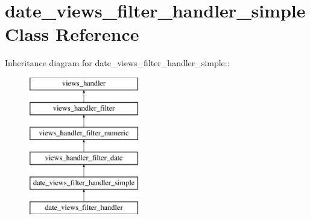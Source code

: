 \hypertarget{classdate__views__filter__handler__simple}{
\section{date\_\-views\_\-filter\_\-handler\_\-simple Class Reference}
\label{classdate__views__filter__handler__simple}
}
Inheritance diagram for date\_\-views\_\-filter\_\-handler\_\-simple::\begin{figure}[H]
\begin{center}
\leavevmode
\includegraphics[height=6cm]{classdate__views__filter__handler__simple}
\end{center}
\end{figure}
